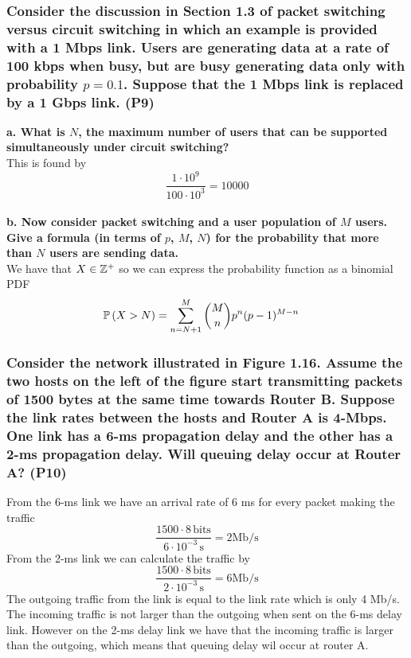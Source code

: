 \subsubsection{Consider the discussion in Section 1.3 of packet switching versus circuit switching in which an example is provided with a 1 Mbps link. Users are generating data at a rate of 100 kbps when busy, but are busy generating data only with probability $p = 0.1$. Suppose that the 1 Mbps link is replaced by a 1 Gbps link. (P9)}

\textbf{a. What is $N$, the maximum number of users that can be supported simultaneously under circuit switching?} \\
This is found by 
\begin{equation*}
    \frac{1 \cdot 10^9}{100 \cdot 10^3} = 10000
\end{equation*}
\\
\textbf{b. Now consider packet switching and a user population of $M$ users. Give a formula (in terms of $p$, $M$, $N$) for the probability that more than $N$ users are sending data.} \\
We have that $X \in \mathbb Z^+$ so we can express the probability function as a binomial PDF
\begin{equation*}
\begin{split}
    \P \lr{X > N} &= \sum_{n = N + 1}^{M} \binom{M}{n} p^n (p - 1)^{M - n}
\end{split}
\end{equation*}

\subsubsection{Consider the network illustrated in Figure 1.16. Assume the two hosts on the left of the figure start transmitting packets of 1500 bytes at the same time towards Router B. Suppose the link rates between the hosts and Router A is 4-Mbps. One link has a 6-ms propagation delay and the other has a 2-ms propagation delay. Will queuing delay occur at Router A? (P10)}

From the 6-ms link we have an arrival rate of 6 ms for every packet making the traffic
\begin{equation*}
    \frac{1500 \cdot 8 \, \text{bits}}{6 \cdot 10^{-3} \, \text{s}} = 2 \text{Mb/s}
\end{equation*}
From the 2-ms link we can calculate the traffic by 
\begin{equation*}
    \frac{1500 \cdot 8 \, \text{bits}}{2 \cdot 10^{-3} \, \text{s}} = 6 \text{Mb/s}
\end{equation*}
The outgoing traffic from the link is equal to the link rate which is only 4 Mb/s. The incoming traffic is not larger than the outgoing when sent on the 6-ms delay link. However on the 2-ms delay link we have that the incoming traffic is larger than the outgoing, which means that queuing delay wil occur at router A.

